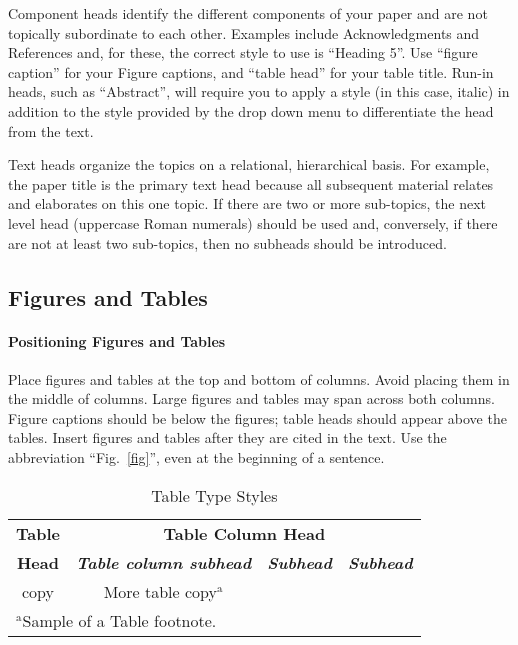 \documentclass[conference]{IEEEtran}
\begin{document}
Component heads identify the different components of your paper and are not 
topically subordinate to each other. Examples include Acknowledgments and 
References and, for these, the correct style to use is ``Heading 5''. Use 
``figure caption'' for your Figure captions, and ``table head'' for your 
table title. Run-in heads, such as ``Abstract'', will require you to apply a 
style (in this case, italic) in addition to the style provided by the drop 
down menu to differentiate the head from the text.

Text heads organize the topics on a relational, hierarchical basis. For 
example, the paper title is the primary text head because all subsequent 
material relates and elaborates on this one topic. If there are two or more 
sub-topics, the next level head (uppercase Roman numerals) should be used 
and, conversely, if there are not at least two sub-topics, then no subheads 
should be introduced.

\subsection{Figures and Tables}\label{FAT}
\paragraph{Positioning Figures and Tables} Place figures and tables at the top and 
bottom of columns. Avoid placing them in the middle of columns. Large 
figures and tables may span across both columns. Figure captions should be 
below the figures; table heads should appear above the tables. Insert 
figures and tables after they are cited in the text. Use the abbreviation 
``Fig.~\ref{fig}'', even at the beginning of a sentence.

\begin{table}[htbp]
\caption{Table Type Styles}
\begin{center}
\begin{tabular}{|c|c|c|c|}
\hline
\textbf{Table}&\multicolumn{3}{|c|}{\textbf{Table Column Head}} \\
\cline{2-4} 
\textbf{Head} & \textbf{\textit{Table column subhead}}& \textbf{\textit{Subhead}}& \textbf{\textit{Subhead}} \\
\hline
copy& More table copy$^{\mathrm{a}}$& &  \\
\hline
\multicolumn{4}{l}{$^{\mathrm{a}}$Sample of a Table footnote.}
\end{tabular}
\label{tab1}
\end{center}
\end{table}
\end{document}
